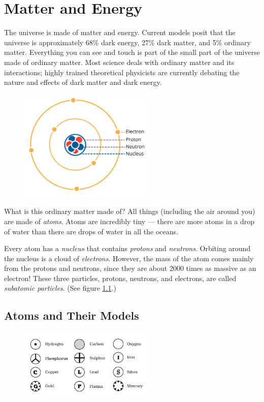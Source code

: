 \chapter{Matter and Energy}

The universe is made of matter and energy. Current models posit that the universe
is approximately 68\% dark energy, 27\% dark matter, and 5\% ordinary matter. 
Everything you can see and touch is part of the small part of the universe made 
of ordinary matter. Most science deals with ordinary matter and its interactions; 
highly trained theoretical physicists are currently debating the nature and 
effects of dark matter and dark energy. 
\begin{figure}
\noindent\includegraphics[width=2.5in]{atom1.png}
\caption{}
\label{fig:atom1}
\end{figure}

What is this ordinary matter made of? All things (including the air around you) 
are made of \textit{atoms}. Atoms are incredibly tiny --- there are more atoms in a drop 
of water than there are drops of water in all the oceans.

Every atom has a \textit{nucleus} that contains \textit{protons} and \textit{neutrons}. Orbiting around the
nucleus is a cloud of \textit{electrons}. However, the mass of the atom comes mainly from 
the protons and neutrons, since they are about 2000 times as massive as an 
electron! These three particles, protons, neutrons, and electrons, are called
\textit{subatomic particles}. (See figure \ref{fig:atom1}.)  
  

\section{Atoms and Their Models}
\begin{figure}
\noindent\includegraphics[width=2.5in, trim={0 0.5cm 0 0.5cm}, clip=true]{daltons_model.png}
\caption{}
\end{figure}

